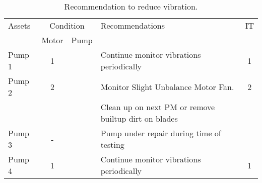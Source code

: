 \begin{table}[!h]
	\caption{Recommendation to reduce vibration.}
	\label{ch045_tbl_vibration_recommendation}
	{\footnotesize
		\begin{tabular}{l|c|c|p{8cm}|c}

\hline
Assets & \multicolumn{2}{c|}{Condition} & Recommendations & IT \\ 
\cline{2-3}
 & Motor & Pump &  &  \\ 
\hline
Pump 1 & 1 &  & Continue monitor vibrations periodically & 1 \\ 


Pump 2 & 2 &  & Monitor Slight Unbalance Motor Fan.  & 2 \\ 
 &  &  & Clean up on next PM or remove builtup dirt on blades &  \\ 

Pump 3 & - &  & Pump under repair during time of testing&  \\ 

Pump 4 & 1 &  & Continue monitor vibrations periodically & 1 \\ 
\hline

		\end{tabular}
	}
\end{table}